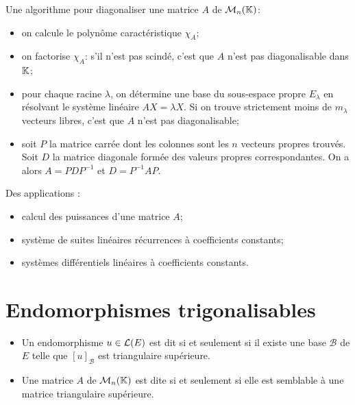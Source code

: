 \documentclass[a4paper]{book}
\begin{document}
\begin{Algorithme}
Une algorithme pour diagonaliser une matrice $A$ de $\mathcal{M}_{n}(\mathbb{K})$:
\begin{itemize}
\item on calcule le polynôme caractéristique $\chi       _A$;
\item on factorise $\chi       _A$: s'il n'est pas scindé, c'est que $A$ n'est pas diagonalisable dans $\mathbb{K} $;
\item pour chaque racine $\lambda    $, on détermine une base du sous-espace propre $E_\lambda    $ en résolvant le système linéaire $AX =\lambda    X$. Si on trouve strictement moins de $m_\lambda    $ vecteurs libres, c'est que $A$ n'est pas diagonalisable;
\item soit $P$ la matrice carrée dont les colonnes sont les $n$ vecteurs propres trouvés. Soit $D$ la matrice diagonale formée des valeurs propres correspondantes. On a alors $A = PDP^{-1}$ et $D = P^{-1}AP$.
\end{itemize}
\end{Algorithme}
Des applications :
\begin{itemize}
\item calcul des puissances d'une matrice $A$;
\item système de suites linéaires récurrences à coefficients constants;
\item systèmes différentiels linéaires à coefficients constants.
\end{itemize}

\section{Endomorphismes trigonalisables}

\begin{Definition}[Trigonalisable]
\begin{itemize}
\item Un endomorphisme $u\in \mathcal{L}(E)$ est dit  si et seulement si il existe une base $\mathcal{B} $ de $E$ telle que $[u]_\mathcal{B} $ est triangulaire supérieure.
\item Une matrice $A$ de $\mathcal{M}_{n}(\mathbb{K})$ est dite  si et seulement si elle est semblable à une matrice triangulaire supérieure.
\end{itemize}
\end{Definition}
\end{document}
